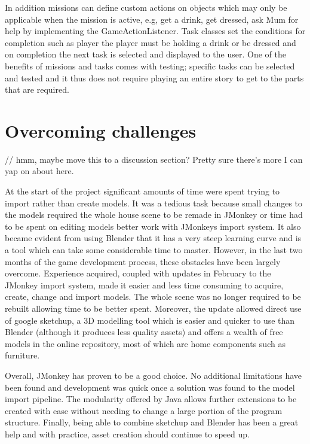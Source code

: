 In addition missions can define custom actions on objects which may only be applicable when the mission is active, e.g, get a drink, get dressed, ask Mum for help by implementing the GameActionListener. Task classes set the conditions for completion such as player the player must be holding a drink or be dressed and on completion the next task is selected and displayed to the user. One of the benefits of missions and tasks comes with testing; specific tasks can be selected and tested and it thus does not require playing an entire story to get to the parts that are required.

\section{Overcoming challenges}

// hmm, maybe move this to a discussion section? Pretty sure there's more I can yap on about here. 

At the start of the project significant amounts of time were spent trying to import rather than create models. It was a tedious task because small changes to the models required the whole house scene to be remade in JMonkey or
time had to be spent on editing models better work with JMonkeys import system. It also became evident from using Blender that it has a very steep learning curve and is a tool which can take some considerable time to master.
However, in the last two months of the game development process, these obstacles have been largely overcome. Experience acquired, coupled with updates in February to the JMonkey import system, made it easier and less
time consuming to acquire, create, change and import models. The whole scene was no longer required to be rebuilt allowing time to be better spent. Moreover, the update allowed direct use of google sketchup, a 3D modelling
tool which is easier and quicker to use than Blender (although it produces less quality assets) and offers a wealth of free models in the online repository, most of which are home components such as furniture.

Overall, JMonkey has proven to be a good choice. No additional limitations have been found and development was quick once a solution was found to the model import pipeline. The modularity offered by Java allows
further extensions to be created with ease without needing to change a large portion of the program structure. Finally, being able to combine sketchup and Blender has been a great help and with practice, asset creation should
continue to speed up.